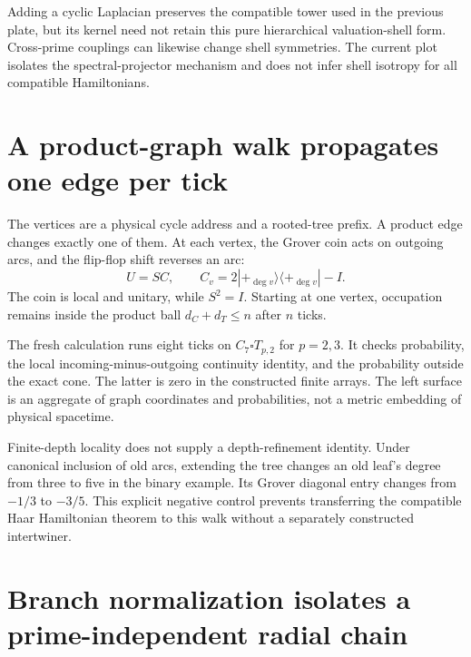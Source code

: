 Adding a cyclic Laplacian preserves the compatible tower used in the previous plate, but its kernel need not retain this pure hierarchical valuation-shell form. Cross-prime couplings can likewise change shell symmetries. The current plot isolates the spectral-projector mechanism and does not infer shell isotropy for all compatible Hamiltonians.



\clearpage
\section{A product-graph walk propagates one edge per tick}

The vertices are a physical cycle address and a rooted-tree prefix. A product edge changes exactly one of them. At each vertex, the Grover coin acts on outgoing arcs, and the flip-flop shift reverses an arc:
\[
U=SC,\qquad C_v=2|+_{\deg v}\rangle\langle+_{\deg v}|-I.
\]
The coin is local and unitary, while $S^2=I$. Starting at one vertex, occupation remains inside the product ball $d_C+d_T\le n$ after $n$ ticks.

The fresh calculation runs eight ticks on $C_7\square T_{p,2}$ for $p=2,3$. It checks probability, the local incoming-minus-outgoing continuity identity, and the probability outside the exact cone. The latter is zero in the constructed finite arrays. The left surface is an aggregate of graph coordinates and probabilities, not a metric embedding of physical spacetime.

Finite-depth locality does not supply a depth-refinement identity. Under canonical inclusion of old arcs, extending the tree changes an old leaf's degree from three to five in the binary example. Its Grover diagonal entry changes from $-1/3$ to $-3/5$. This explicit negative control prevents transferring the compatible Haar Hamiltonian theorem to this walk without a separately constructed intertwiner.



\clearpage
\section{Branch normalization isolates a prime-independent radial chain}

